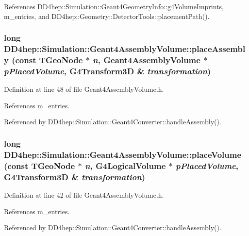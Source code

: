 References DD4hep::Simulation::Geant4GeometryInfo::g4VolumeImprints, m\_\-entries, and DD4hep::Geometry::DetectorTools::placementPath().\hypertarget{class_d_d4hep_1_1_simulation_1_1_geant4_assembly_volume_adde18f645695f14e3ae08d7fed2451c1}{
\subsubsection[{placeAssembly}]{\setlength{\rightskip}{0pt plus 5cm}long DD4hep::Simulation::Geant4AssemblyVolume::placeAssembly (const TGeoNode $\ast$ {\em n}, \/  {\bf Geant4AssemblyVolume} $\ast$ {\em pPlacedVolume}, \/  G4Transform3D \& {\em transformation})}}
\label{class_d_d4hep_1_1_simulation_1_1_geant4_assembly_volume_adde18f645695f14e3ae08d7fed2451c1}


Definition at line 48 of file Geant4AssemblyVolume.h.

References m\_\-entries.

Referenced by DD4hep::Simulation::Geant4Converter::handleAssembly().\hypertarget{class_d_d4hep_1_1_simulation_1_1_geant4_assembly_volume_a7ab45077a09ab1397f437b167b097c94}{
\subsubsection[{placeVolume}]{\setlength{\rightskip}{0pt plus 5cm}long DD4hep::Simulation::Geant4AssemblyVolume::placeVolume (const TGeoNode $\ast$ {\em n}, \/  G4LogicalVolume $\ast$ {\em pPlacedVolume}, \/  G4Transform3D \& {\em transformation})}}
\label{class_d_d4hep_1_1_simulation_1_1_geant4_assembly_volume_a7ab45077a09ab1397f437b167b097c94}


Definition at line 42 of file Geant4AssemblyVolume.h.

References m\_\-entries.

Referenced by DD4hep::Simulation::Geant4Converter::handleAssembly().

